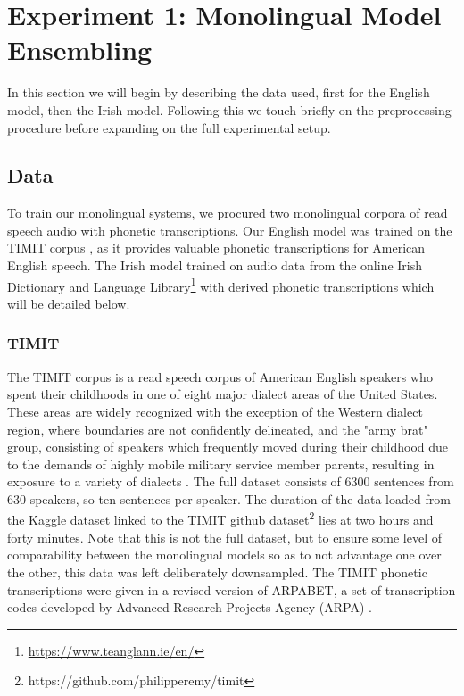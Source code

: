 \documentclass[thesis]{cluu}
\begin{document}
\section{Experiment 1: Monolingual Model Ensembling} \label{ex:1}
In this section we will begin by describing the data used, first for the English model, then the Irish model. Following this we touch briefly on the preprocessing procedure before expanding on the full experimental setup.

\subsection{Data}
To train our monolingual systems, we procured two monolingual corpora of read speech audio with phonetic transcriptions. Our English model was trained on the TIMIT corpus \textcite{garofoloDARPATIMITAcousticphonetic1993}, as it provides valuable phonetic transcriptions for American English speech. The Irish model trained on audio data from the online Irish Dictionary and Language Library\footnote{\url{https://www.teanglann.ie/en/}} with derived phonetic transcriptions which will be detailed below.

\subsubsection{TIMIT}
The TIMIT corpus is a read speech corpus of American English speakers who spent their childhoods in one of eight major dialect areas of the United States. These areas are widely recognized with the exception of the Western dialect region, where boundaries are not confidently delineated, and the "army brat" group, consisting of speakers which frequently moved during their childhood due to the demands of highly mobile military service member parents, resulting in exposure to a variety of dialects \parencite{garofoloDARPATIMITAcousticphonetic1993}. The full dataset consists of 6300 sentences from 630 speakers, so ten sentences per speaker. The duration of the data loaded from the Kaggle dataset linked to the TIMIT github dataset\footnote{https://github.com/philipperemy/timit} lies at two hours and forty minutes. Note that this is not the full dataset, but to ensure some level of comparability between the monolingual models so as to not advantage one over the other, this data was left deliberately downsampled. The TIMIT phonetic transcriptions were given in a revised version of ARPABET, a set of transcription codes developed by Advanced Research Projects Agency (ARPA) \parencite[for the original set, see][]{peoplescomputercompanyDrDobbsJournal1976}. 
\end{document}
